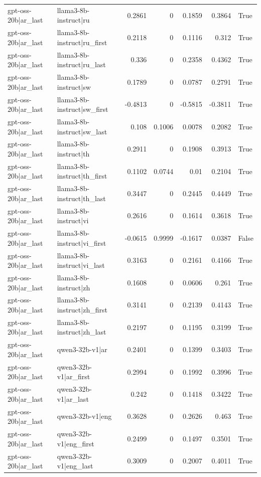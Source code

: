 \begin{table}
\begin{tabular}{l l r r r r l}
gpt-oss-20b|ar_last & llama3-8b-instruct|ru & 0.2861 & 0 & 0.1859 & 0.3864 & True \\
gpt-oss-20b|ar_last & llama3-8b-instruct|ru_first & 0.2118 & 0 & 0.1116 & 0.312 & True \\
gpt-oss-20b|ar_last & llama3-8b-instruct|ru_last & 0.336 & 0 & 0.2358 & 0.4362 & True \\
gpt-oss-20b|ar_last & llama3-8b-instruct|sw & 0.1789 & 0 & 0.0787 & 0.2791 & True \\
gpt-oss-20b|ar_last & llama3-8b-instruct|sw_first & -0.4813 & 0 & -0.5815 & -0.3811 & True \\
gpt-oss-20b|ar_last & llama3-8b-instruct|sw_last & 0.108 & 0.1006 & 0.0078 & 0.2082 & True \\
gpt-oss-20b|ar_last & llama3-8b-instruct|th & 0.2911 & 0 & 0.1908 & 0.3913 & True \\
gpt-oss-20b|ar_last & llama3-8b-instruct|th_first & 0.1102 & 0.0744 & 0.01 & 0.2104 & True \\
gpt-oss-20b|ar_last & llama3-8b-instruct|th_last & 0.3447 & 0 & 0.2445 & 0.4449 & True \\
gpt-oss-20b|ar_last & llama3-8b-instruct|vi & 0.2616 & 0 & 0.1614 & 0.3618 & True \\
gpt-oss-20b|ar_last & llama3-8b-instruct|vi_first & -0.0615 & 0.9999 & -0.1617 & 0.0387 & False \\
gpt-oss-20b|ar_last & llama3-8b-instruct|vi_last & 0.3163 & 0 & 0.2161 & 0.4166 & True \\
gpt-oss-20b|ar_last & llama3-8b-instruct|zh & 0.1608 & 0 & 0.0606 & 0.261 & True \\
gpt-oss-20b|ar_last & llama3-8b-instruct|zh_first & 0.3141 & 0 & 0.2139 & 0.4143 & True \\
gpt-oss-20b|ar_last & llama3-8b-instruct|zh_last & 0.2197 & 0 & 0.1195 & 0.3199 & True \\
gpt-oss-20b|ar_last & qwen3-32b-v1|ar & 0.2401 & 0 & 0.1399 & 0.3403 & True \\
gpt-oss-20b|ar_last & qwen3-32b-v1|ar_first & 0.2994 & 0 & 0.1992 & 0.3996 & True \\
gpt-oss-20b|ar_last & qwen3-32b-v1|ar_last & 0.242 & 0 & 0.1418 & 0.3422 & True \\
gpt-oss-20b|ar_last & qwen3-32b-v1|eng & 0.3628 & 0 & 0.2626 & 0.463 & True \\
gpt-oss-20b|ar_last & qwen3-32b-v1|eng_first & 0.2499 & 0 & 0.1497 & 0.3501 & True \\
gpt-oss-20b|ar_last & qwen3-32b-v1|eng_last & 0.3009 & 0 & 0.2007 & 0.4011 & True \\

\end{tabular}
\end{table}
